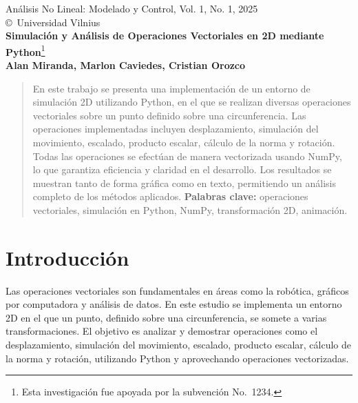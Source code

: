\documentclass[a4paper, 10pt]{article}
\begin{document}
\begin{center}
Análisis No Lineal: Modelado y Control, Vol. 1, No. 1, 2025\\
\copyright\ 
Universidad Vilnius\\[24pt]
\LARGE
\textbf{Simulación y Análisis de Operaciones Vectoriales en 2D mediante Python}\footnote{Esta investigación fue apoyada por la subvención No.\ 1234.}\\[6pt]
\small
\textbf {Alan Miranda, Marlon Caviedes, Cristian Orozco}\\[6pt]
\end{center}

\begin{abstract}
En este trabajo se presenta una implementación de un entorno de simulación 2D utilizando Python, en el que se realizan diversas operaciones vectoriales sobre un punto definido sobre una circunferencia. Las operaciones implementadas incluyen desplazamiento, simulación del movimiento, escalado, producto escalar, cálculo de la norma y rotación. Todas las operaciones se efectúan de manera vectorizada usando NumPy, lo que garantiza eficiencia y claridad en el desarrollo. Los resultados se muestran tanto de forma gráfica como en texto, permitiendo un análisis completo de los métodos aplicados.
\textbf{Palabras clave:} operaciones vectoriales, simulación en Python, NumPy, transformación 2D, animación.
\end{abstract}

\nocite{2009ProcDETAp}

\section{Introducción}\label{s:1}
Las operaciones vectoriales son fundamentales en áreas como la robótica, gráficos por computadora y análisis de datos. En este estudio se implementa un entorno 2D en el que un punto, definido sobre una circunferencia, se somete a varias transformaciones. El objetivo es analizar y demostrar operaciones como el desplazamiento, simulación del movimiento, escalado, producto escalar, cálculo de la norma y rotación, utilizando Python y aprovechando operaciones vectorizadas.
\end{document}
